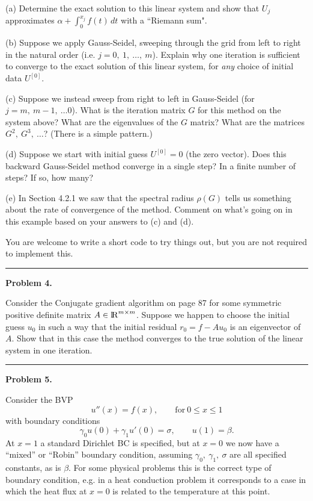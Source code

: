 \documentclass[10pt]{article}
\begin{document}
(a) Determine the exact solution to this linear system and show that 
$U_j$ approximates $\alpha + \int_0^{x_j} f(t)\, dt$ with a ``Riemann sum".

(b) Suppose we apply Gauss-Seidel, sweeping through the grid from left to right in the natural order (i.e. $j = 0, ~1,~\ldots,~m$).  
Explain why one iteration is sufficient to
converge to the exact solution of this linear system, for {\em any} choice
of initial data $U^{[0]}$.

(c) Suppose we instead sweep from right to left in
Gauss-Seidel (for $j = m,~m-1,~\ldots 0$).
What is the iteration matrix $G$ for this method on the system above?
What are the eigenvalues of the $G$ matrix? 
What are the matrices $G^2,~ G^3,~ \ldots$?  (There is a simple pattern.)

(d) Suppose we start with initial guess $U^{[0]}=0$ (the zero vector).
Does this backward Gauss-Seidel method converge in a single step? 
In a finite number of steps? If so, how many?

(e) In Section 4.2.1 we saw that the spectral radius $\rho(G)$ tells us 
something about the rate of convergence of the method.  Comment on 
what's going on in this example based on your answers to (c) and (d).

You are welcome to write a short code to try things out, but you are not
required to implement this.




\vskip 1cm
\hrule
{\bf Problem 4.}

Consider the Conjugate gradient algorithm on page 87 for some symmetric positive
definite matrix $A \in{{\rm l} \kern -.15em {\rm R} }^{m\times m}$.  Suppose we happen
to choose the initial guess $u_0$ in such a way that the initial residual
$r_0 = f - Au_0$ is an eigenvector of $A$.  Show that in this case the
method converges to the true solution of the linear system in one iteration.




\vskip 1cm
\hrule
{\bf Problem 5.} 

Consider the BVP 
\[
u''(x) = f(x), \qquad\text{for}~ 0\leq x \leq 1
\]
with boundary conditions
\[
\gamma_0 u(0) + \gamma_1 u'(0) = \sigma, \qquad u(1)=\beta.
\]
At $x=1$ a standard Dirichlet BC is specified, but at $x=0$ we now have a
``mixed'' or ``Robin'' boundary condition, assuming $\gamma_0,~\gamma_1,~\sigma$
are all specified constants, as is $\beta$. For some physical problems this is
the correct type of boundary condition, e.g. in a heat conduction problem it
corresponds to a case in which the heat flux at $x=0$ is related to the
temperature at this point.
\end{document}
